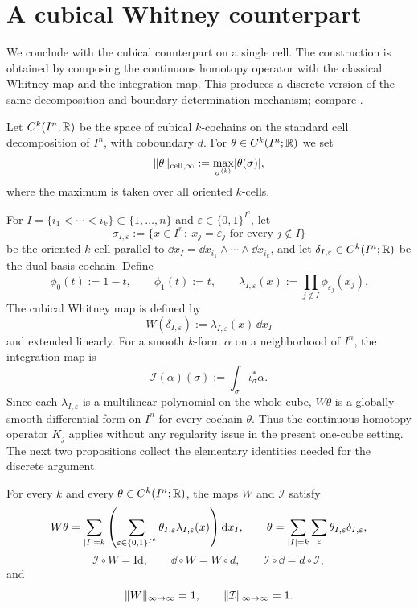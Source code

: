 \section{A cubical Whitney counterpart}

We conclude with the cubical counterpart on a single cell. The construction is
obtained by composing the continuous homotopy operator with the classical
Whitney map and the integration map. This produces a discrete version of the
same decomposition and boundary-determination mechanism; compare
\cite{Whitney1957,Dodziuk1976,Dupont1976,DupontBook1978,Albert2020,
ArnoldFalkWinther2010,ArnoldAwanou2014,KaczynskiMischaikowMrozek2004}.

Let $C^k(I^n;\mathbb{R})$ be the space of cubical $k$-cochains on the standard cell
decomposition of $I^n$, with coboundary $d$. For $\theta\in C^k(I^n;\mathbb{R})$ we
set
\[
\lVert \theta \rVert_{\mathrm{cell},\infty}:=
\max_{\sigma^{(k)}}\lvert \theta(\sigma) \rvert,
\]
where the maximum is taken over all oriented $k$-cells.

For $I=\{i_1<\cdots<i_k\}\subset\{1,\dots,n\}$ and
$\varepsilon\in\{0,1\}^{I^c}$, let
\[
\sigma_{I,\varepsilon}
:=
\{x\in I^n:\ x_j=\varepsilon_j \text{ for every } j\notin I\}
\]
be the oriented $k$-cell parallel to
$\dd x_I=\dd x_{i_1}\wedge\cdots\wedge \dd x_{i_k}$, and let
$\delta_{I,\varepsilon}\in C^k(I^n;\mathbb{R})$ be the dual basis cochain. Define
\[
\phi_0(t):=1-t,
\qquad
\phi_1(t):=t,
\qquad
\lambda_{I,\varepsilon}(x):=
\prod_{j\notin I}\phi_{\varepsilon_j}(x_j).
\]
The cubical Whitney map is defined by
\[
W(\delta_{I,\varepsilon}):=
\lambda_{I,\varepsilon}(x)\,\dd x_I
\]
and extended linearly. For a smooth $k$-form $\alpha$ on a neighborhood of
$I^n$, the integration map is
\[
\mathcal I(\alpha)(\sigma):=
\int_\sigma \iota_\sigma^\ast\alpha.
\]
Since each $\lambda_{I,\varepsilon}$ is a multilinear polynomial on the whole
cube, $W\theta$ is a globally smooth differential form on $I^n$ for every
cochain $\theta$. Thus the continuous homotopy operator $K_j$ applies without
any regularity issue in the present one-cube setting. The next two
propositions collect the elementary identities needed for the discrete
argument.

\begin{proposition}
\label{prop:cubical-whitney}
For every $k$ and every $\theta\in C^k(I^n;\mathbb{R})$, the maps $W$ and
$\mathcal I$ satisfy
\[
W\theta=
\sum_{\lvert I \rvert=k}
\left(
\sum_{\varepsilon\in\{0,1\}^{I^c}}
\theta_{I,\varepsilon}\lambda_{I,\varepsilon}(x)
\right)\mathrm{d} x_I,
\qquad
\theta=\sum_{\lvert I \rvert=k}\sum_{\varepsilon}\theta_{I,\varepsilon}\delta_{I,\varepsilon},
\]
\[
\mathcal I\circ W=\mathrm{Id},
\qquad
\dd\circ W=W\circ d,
\qquad
\mathcal I\circ \dd=d\circ \mathcal I,
\]
and
\[
\lVert W \rVert_{\infty\to\infty}=1,
\qquad
\lVert \mathcal I \rVert_{\infty\to\infty}=1.
\]
\end{proposition}

